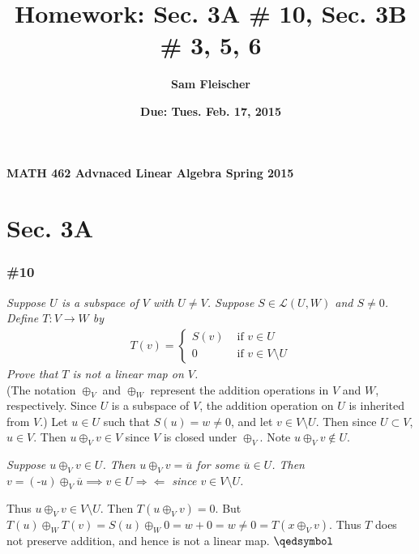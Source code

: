 \documentclass[12pt]{article}
\begin{document}
{\bf MATH 462 \hfill Advnaced Linear Algebra \hfill Spring 2015}

\title{\bf Homework: Sec. 3A \# 10, Sec. 3B \# 3, 5, 6}
\author{\bf Sam Fleischer}
\date{\bf Due: Tues. Feb. 17, 2015}

{\let\newpage\relax\maketitle}
\maketitle

\section*{Sec. 3A}
\subsubsection*{\#10}
{\it Suppose $U$ is a subspace of $V$ with $U \neq V$.  Suppose $S \in \mathcal{L}(U, W)$ and $S \neq 0$.  Define $T: V\rightarrow W$ by}
\begin{align*}
T(v) = \left\{\begin{array}{ll}S(v) & \text{\ \ if } v \in U \\
0 & \text{\ \ if } v \in V \setminus U
\end{array}\right.
\end{align*}
{\it Prove that $T$ is not a linear map on $V$.} \\

\noindent (The notation $\oplus_V$ and $\oplus_W$ represent the addition operations in $V$ and $W$, respectively.  Since $U$ is a subspace of $V$, the addition operation on $U$ is inherited from $V$.)  Let $u \in U$ such that $S(u) = w \neq 0$, and let $v \in V \setminus U$.  Then since $U \subset V$, $u \in V$.  Then $u \oplus_V v \in V$ since $V$ is closed under $\oplus_V$.  Note $u \oplus_V v \notin U$.
\begin{adjustwidth}{2cm}{}
{\it Suppose $u \oplus_V v \in U$.  Then $u \oplus_V v = \overline{u}$ for some $\overline{u} \in U$.  Then $v = (\text{-}u) \oplus_V \overline{u} \implies v \in U \Longrightarrow\Longleftarrow$ since $v \in V \setminus U$.}
\end{adjustwidth}
Thus $u \oplus_V v \in V \setminus U$.  Then $T(u \oplus_V v) = 0$.  But $T(u) \oplus_W T(v) = S(u) \oplus_W 0 = w + 0 = w \neq 0 = T(x \oplus_V v)$.  Thus $T$ does not preserve addition, and hence is not a linear map. $\qedsymbol$
\end{document}
